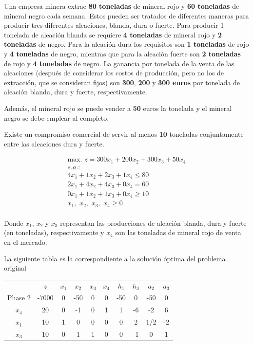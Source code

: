 Una empresa minera extrae \textbf{80 toneladas} de mineral rojo y \textbf{60 toneladas} de mineral negro cada semana. Estos pueden ser tratados de diferentes maneras para producir tres diferentes aleaciones, blanda, dura o fuerte. Para producir 1 tonelada de aleación blanda se requiere \textbf{4 toneladas} de mineral rojo y \textbf{2 toneladas} de negro. Para la aleación dura los requisitos son \textbf{1 toneladas} de rojo y \textbf{4 toneladas} de negro, mientras que para la aleación fuerte son \textbf{2 toneladas} de rojo y \textbf{4 toneladas} de negro. La ganancia por tonelada de la venta de las aleaciones (después de considerar los costos de producción, pero no los de extracción, que se consideran fijos) son \textbf{300}, \textbf{200} y \textbf{300 euros} por tonelada de aleación blanda, dura y fuerte, respectivamente.

Además, el mineral rojo se puede vender a \textbf{50} euros la tonelada y el mineral negro se debe emplear al completo.

Existe un compromiso comercial de servir al menos \textbf{10} toneladas conjuntamente entre las aleaciones dura y fuerte.

\begin{equation}
\begin{split}
\mbox{max. } z = 300x_1 + 200x_2 + 300x_3 + 50x_4\\
s.a.:\\
4x_1 + 1x_2 + 2x_3 + 1x_4 \leq 80\\
2x_1 + 4x_2 + 4x_3 + 0x_4 = 60\\
0x_1 + 1x_2 + 1x_3 + 0x_4 \geq 10\\
x_1,\,\,x_2,\,\,x_3,\,\,x_4\geq 0\\
\end{split}
\end{equation}

Donde $x_1$, $x_2$ y $x_3$ representan las producciones de aleación blanda, dura y fuerte (en toneladas), respectivamente y $x_4$ son las toneladas de mineral rojo de venta en el mercado.

La siguiente tabla es la correspondiente a la solución óptima del problema original

\begin{center}
\begin{tabular}{c|c|cccccccc|}
 & $z$ & $x_1$ & $x_2$ & $x_3$ & $x_4$ & $h_1$ & $h_3$ & $a_2$ & $a_3$\\ 
Phase 2 & -7000 & 0 & -50 & 0 & 0 & -50 & 0 & -50 & 0 \\ 
\hline
$x_4$ & 20  & 0 & -1 & 0 & 1 & 1 & -6 & -2 & 6\\ 
$x_1$ & 10  & 1 & 0 & 0 & 0 & 0 & 2 & 1/2 & -2\\ 
$x_3$ & 10  & 0 & 1 & 1 & 0 & 0 & -1 & 0 & 1\\ 
\hline
\end{tabular}
\end{center}


